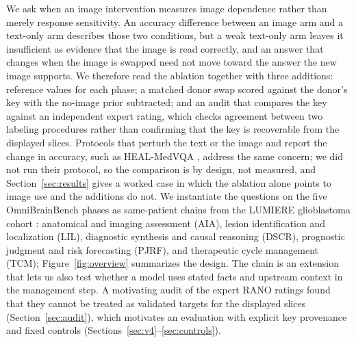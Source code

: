 \documentclass[11pt]{article}
\begin{document}
We ask when an image intervention measures image dependence rather than merely response sensitivity. An accuracy difference between an image arm and a text-only arm describes those two conditions, but a weak text-only arm leaves it insufficient as evidence that the image is read correctly, and an answer that changes when the image is swapped need not move toward the answer the new image supports. We therefore read the ablation together with three additions: reference values for each phase; a matched donor swap scored against the donor's key with the no-image prior subtracted; and an audit that compares the key against an independent expert rating, which checks agreement between two labeling procedures rather than confirming that the key is recoverable from the displayed slices. Protocols that perturb the text or the image and report the change in accuracy, such as HEAL-MedVQA \citep{nguyen2025localizing}, address the same concern; we did not run their protocol, so the comparison is by design, not measured, and Section~\ref{sec:results} gives a worked case in which the ablation alone points to image use and the additions do not. We instantiate the questions on the five OmniBrainBench phases \citep{peng2026omnibrainbench} as same-patient chains from the LUMIERE glioblastoma cohort \citep{suter2022lumiere}: anatomical and imaging assessment (AIA), lesion identification and localization (LIL), diagnostic synthesis and causal reasoning (DSCR), prognostic judgment and risk forecasting (PJRF), and therapeutic cycle management (TCM); Figure~\ref{fig:overview} summarizes the design. The chain is an extension that lets us also test whether a model uses stated facts and upstream context in the management step. A motivating audit of the expert RANO ratings found that they cannot be treated as validated targets for the displayed slices (Section~\ref{sec:audit}), which motivates an evaluation with explicit key provenance and fixed controls (Sections~\ref{sec:v4}--\ref{sec:controls}).
\end{document}
